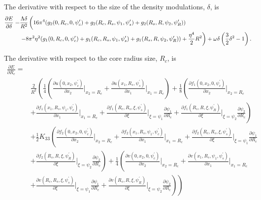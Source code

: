 \documentclass[12pt]{article}
\begin{document}
The derivative with respect to the size of the density modulations, $\delta$, is
\begin{align}
\frac{\partial E}{\partial \delta}=&\frac{\Lambda\delta}{R^2}\left(\vphantom{\frac{1}{2}}16\pi^4(g_2(0,R_c,0,\psi_c^{\prime})+g_2(R_c,R_s,\psi_1,\psi_s^{\prime})+g_2(R_s,R,\psi_2,\psi_R^{\prime}))\right.\nonumber\\
&\left.-8\pi^2\eta^2(g_1(0,R_c,0,\psi_c^{\prime})+g_1(R_c,R_s,\psi_1,\psi_s^{\prime})+g_1(R_s,R,\psi_2,\psi_R^{\prime}))+\frac{\eta^4}{2}R^2\right)+\omega\delta\left(\frac{3}{2}\delta^2-1\right).
\end{align}

The derivative with respect to the core radius size, $R_c$, is
\begin{align}
\frac{\partial E}{\partial R_c}=&\nonumber\\
&\frac{2}{R^2}\left(\frac{1}{4}\left(\frac{\partial u(0,x_2,\psi_c^{\prime})}{\partial x_2}\bigg|_{x_2=R_c}+\frac{\partial u(x_1,R_s,\psi_s^{\prime})}{\partial x_1}\bigg|_{x_1=R_c}\right)+\frac{1}{8}\left(\frac{\partial f_1(0,x_2,0,\psi_c^{\prime})}{\partial x_2}\bigg|_{x_2=R_c}\right.\right.\nonumber\\
&\left.+\frac{\partial f_1(x_1,R_s,\psi_1,\psi_c^{\prime})}{\partial x_1}\bigg|_{x_1=R_c}+\frac{\partial f_1(R_c,R_s,\xi,\psi_s^{\prime})}{\partial \xi}\bigg|_{\xi=\psi_1}\frac{\partial \psi_1}{\partial R_c}+\frac{\partial f_1(R_s,R,\xi,\psi_R^{\prime})}{\partial \xi}\bigg|_{\xi=\psi_2}\frac{\partial \psi_2}{\partial R_c}\right)\nonumber\\
&+\frac{1}{2}K_{33}\left(\frac{\partial f_2(0,x_2,0,\psi_c^{\prime})}{\partial x_2}\bigg|_{x_2=R_c}+\frac{\partial f_2(x_1,R_s,\psi_1,\psi_c^{\prime})}{\partial x_1}\bigg|_{x_1=R_c}+\frac{\partial f_2(R_c,R_s,\xi,\psi_s^{\prime})}{\partial \xi}\bigg|_{\xi=\psi_1}\frac{\partial \psi_1}{\partial R_c}\right.\nonumber\\
&\left.+\frac{\partial f_2(R_s,R,\xi,\psi_R^{\prime})}{\partial \xi}\bigg|_{\xi=\psi_2}\frac{\partial \psi_2}{\partial R_c}\right)+\frac{1}{4}\left(\frac{\partial v(0,x_2,0,\psi_c^{\prime})}{\partial x_2}\bigg|_{x_2=R_c}+\frac{\partial v(x_1,R_s,\psi_1,\psi_s^{\prime})}{\partial x_1}\bigg|_{x_1=R_c}\right.\nonumber\\
&\left.\left.+\frac{\partial v(R_c,R_s,\xi,\psi_s^{\prime})}{\partial \xi}\bigg|_{\xi=\psi_1}\frac{\partial\psi_1}{\partial R_c}+\frac{\partial v(R_s,R,\xi,\psi_R^{\prime})}{\partial \xi}\bigg|_{\xi=\psi_2}\frac{\partial\psi_2}{\partial R_c}\right)\right)\nonumber\\

\end{align}
\end{document}

